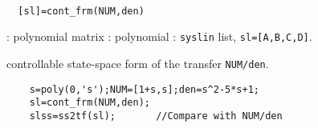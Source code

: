 \begin{mandesc}
   \\ %
\end{mandesc}
\begin{calling_sequence}
\begin{verbatim}
  [sl]=cont_frm(NUM,den)  
\end{verbatim}
\end{calling_sequence}
\begin{parameters}
  \begin{varlist}
    : polynomial matrix
    : polynomial
    : \verb!syslin! list, \verb!sl=[A,B,C,D]!.
  \end{varlist}
\end{parameters}
\begin{mandescription}
  controllable state-space form of the transfer \verb!NUM/den!.
\end{mandescription}
\begin{examples}
  \begin{Verbatim}
    s=poly(0,'s');NUM=[1+s,s];den=s^2-5*s+1;
    sl=cont_frm(NUM,den); 
    slss=ss2tf(sl);       //Compare with NUM/den
  \end{Verbatim}
\end{examples}
\begin{manseealso}
      
\end{manseealso}
